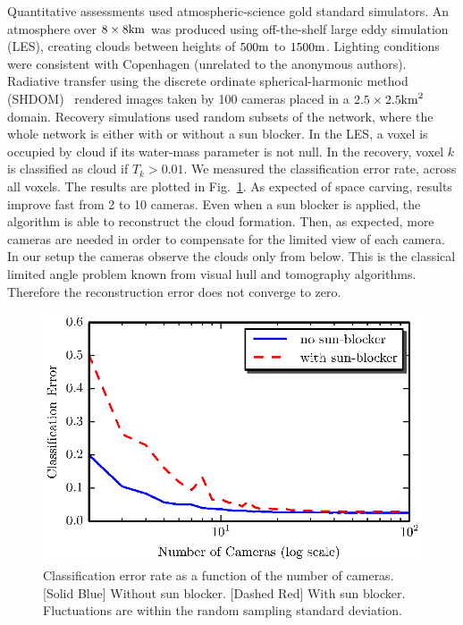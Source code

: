 \documentclass[runningheads]{llncs}
\begin{document}
Quantitative assessments used atmospheric-science gold standard simulators.
An atmosphere over $8\times8{\rm km}$  was produced using off-the-shelf large eddy simulation (LES), creating clouds between heights of $500{\rm m}$ to $1500{\rm m}$.
Lighting conditions were consistent with Copenhagen (unrelated to the anonymous authors).
Radiative transfer using the discrete ordinate spherical-harmonic method (SHDOM)~\cite{Evans1998} rendered images taken by 100 cameras placed in a $2.5\times 2.5{\rm km}^2$ domain. Recovery simulations used random subsets
of the network, where the whole network is either with or without
a sun blocker. In the LES, a voxel is occupied by cloud if its water-mass parameter is not null. In the recovery, voxel $k$ is classified as cloud if $T_k>0.01$.
We measured the classification error rate, across all voxels.
The results are plotted in Fig.~\ref{fig:simulations}.  As expected of space carving,
results improve fast from 2 to 10 cameras. Even when a sun blocker is applied,
the algorithm is able to reconstruct the cloud formation. Then, as expected,
more cameras are needed in order to compensate for the limited view of
each camera. In our setup the cameras observe the clouds only from below. This is the classical limited
angle problem known from visual hull and tomography algorithms. Therefore the reconstruction error does not
converge to zero.
\begin{figure}
  \begin{center}
    \includegraphics{figures/simulations.eps}
    \caption{Classification error rate as a function of the number of
    cameras. [Solid Blue] Without sun blocker. [Dashed Red] With sun blocker.
    Fluctuations are within the random sampling standard deviation.}
    \label{fig:simulations}
  \end{center}
\end{figure}
\end{document}
